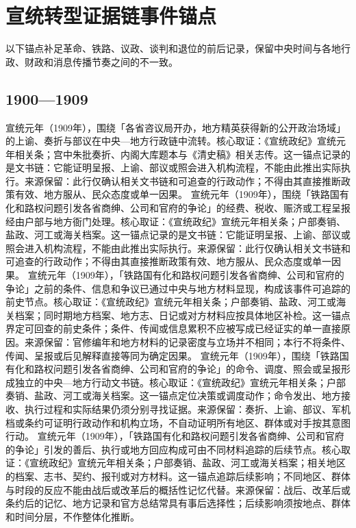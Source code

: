 \section{宣统转型证据链事件锚点}
以下锚点补足革命、铁路、议政、谈判和退位的前后记录，保留中央时间与各地行政、财政和消息传播节奏之间的不一致。
\subsection{1900—1909}
宣统元年（1909年），围绕「各省咨议局开办，地方精英获得新的公开政治场域」的上谕、奏折与部议在中央—地方行政链中流转。核心取证：《宣统政纪》宣统元年相关条；宫中朱批奏折、内阁大库题本与《清史稿》相关志传。这一锚点记录的是文书链：它能证明呈报、上谕、部议或照会进入机构流程，不能由此推出实际执行。来源保留：此行仅确认相关文书链和可追查的行政动作；不得由其直接推断政策有效、地方服从、民众态度或单一因果。
宣统元年（1909年），围绕「铁路国有化和路权问题引发各省商绅、公司和官府的争论」的经费、税收、赈济或工程呈报经由户部与地方衙门处理。核心取证：《宣统政纪》宣统元年相关条；户部奏销、盐政、河工或海关档案。这一锚点记录的是文书链：它能证明呈报、上谕、部议或照会进入机构流程，不能由此推出实际执行。来源保留：此行仅确认相关文书链和可追查的行政动作；不得由其直接推断政策有效、地方服从、民众态度或单一因果。
宣统元年（1909年），「铁路国有化和路权问题引发各省商绅、公司和官府的争论」之前的条件、信息和争议已通过中央与地方材料显现，构成该事件可追踪的前史节点。核心取证：《宣统政纪》宣统元年相关条；户部奏销、盐政、河工或海关档案；同时期地方档案、地方志、日记或对方材料应按具体地区补检。这一锚点界定可回查的前史条件；条件、传闻或信息累积不应被写成已经证实的单一直接原因。来源保留：官修编年和地方材料的记录密度与立场并不相同；本行不将条件、传闻、呈报或后见解释直接等同为确定因果。
宣统元年（1909年），围绕「铁路国有化和路权问题引发各省商绅、公司和官府的争论」的命令、调度、照会或呈报形成独立的中央—地方行动文书链。核心取证：《宣统政纪》宣统元年相关条；户部奏销、盐政、河工或海关档案。这一锚点定位决策或调度动作；命令发出、地方接收、执行过程和实际结果仍须分别寻找证据。来源保留：奏折、上谕、部议、军机档或条约可证明行政动作和机构立场，不自动证明所有地区、群体或对手按其意图行动。
宣统元年（1909年），「铁路国有化和路权问题引发各省商绅、公司和官府的争论」引发的善后、执行或地方回应构成可由不同材料追踪的后续节点。核心取证：《宣统政纪》宣统元年相关条；户部奏销、盐政、河工或海关档案；相关地区的档案、志书、契约、报刊或对方材料。这一锚点追踪后续影响；不同地区、群体与时段的反应不能由战后或改革后的概括性记忆代替。来源保留：战后、改革后或条约后的记忆、地方记录和官方总结常具有事后选择性；后续影响须按地点、群体和时间分层，不作整体化推断。
